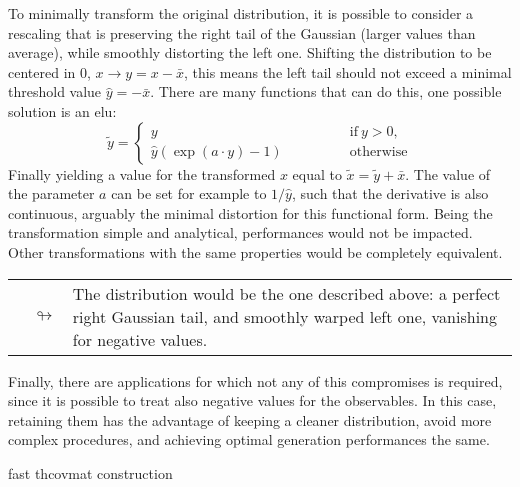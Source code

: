 \begin{description}[font=\scshape,leftmargin=2cm,style=nextline]
  \item[distortion] To minimally transform the original distribution, it is
    possible to consider a rescaling that is preserving the right tail of the
    Gaussian (larger values than average), while smoothly distorting the left
    one.
    Shifting the distribution to be centered in $0$, $x \to y = x - \bar{x}$,
    this means the left tail should not exceed a minimal threshold value
    $\hat{y} = -\bar{x}$.
    There are many functions that can do this, one possible solution is an
    \acrfull{elu}:
    \begin{equation}
      \tilde{y} =
      \begin{cases}
        y \qquad\qquad &\text{if}~y>0,\\
        \hat{y}\left(\exp(a \cdot y)-1\right) \qquad\qquad &\text{otherwise}
      \end{cases}
    \end{equation}
    Finally yielding a value for the transformed $x$ equal to $\tilde{x} =
    \tilde{y} + \bar{x}$.
    The value of the parameter $a$ can be set for example to $1/\hat{y}$, such
    that the derivative is also continuous, arguably the minimal distortion for
    this functional form.
    Being the transformation simple and analytical, performances would not be
    impacted.
    Other transformations with the same properties would be completely
    equivalent.

    \begin{tabularx}{\linewidth}{cX}
      $\quad\looparrowright$ & The distribution would be the one described
      above: a perfect right Gaussian tail, and smoothly warped left one,
      vanishing for negative values.
    \end{tabularx}

  \item[no bound] Finally, there are applications for which not any of this
    compromises is required, since it is possible to treat also negative values
    for the observables.
    In this case, retaining them has the advantage of keeping a cleaner
    distribution, avoid more complex procedures, and achieving optimal
    generation performances the same.
\end{description}

fast thcovmat construction
